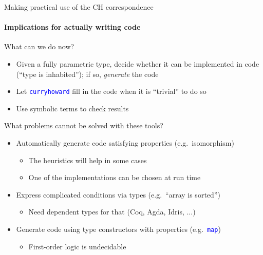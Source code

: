 \documentclass[english]{beamer}
\begin{document}
\begin{frame}{Making practical use of the CH correspondence}


\framesubtitle{Implications for actually writing code}

What can we do now?
\begin{itemize}
\item Given a fully parametric type, decide whether it can be implemented
in code (``type is inhabited''); if so, \emph{generate} the code
\item Let \texttt{\textcolor{blue}{\footnotesize{}curryhoward}} fill in
the code when it is ``trivial'' to do so
\item Use symbolic terms to check results
\end{itemize}
What problems cannot be solved with these tools?
\begin{itemize}
\item Automatically generate code satisfying properties (e.g.\ isomorphism)
\begin{itemize}
\item The heuristics will help in some cases
\item One of the implementations can be chosen at run time
\end{itemize}
\item Express complicated conditions via types (e.g.\ ``array is sorted'')
\begin{itemize}
\item Need dependent types for that (Coq, Agda, Idris, ...)
\end{itemize}
\item Generate code using type constructors with properties (e.g.\ \texttt{\textcolor{blue}{\footnotesize{}map}})
\begin{itemize}
\item First-order logic is undecidable
\end{itemize}
\end{itemize}
\end{frame}
\end{document}
